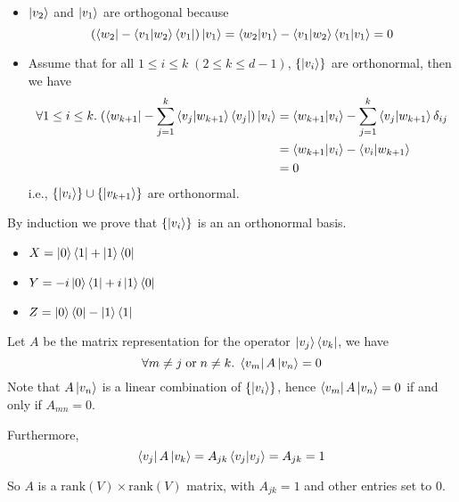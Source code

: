 \documentclass{homeworg}
\begin{document}
\begin{itemize}
    \item $\ket{v_2}$ and $\ket{v_1}$ are orthogonal because
    \[(\bra{w_2}-\braket{v_1|w_2}\bra{v_1})\ket{v_1}=\braket{w_2|v_1}-\braket{v_1|w_2}\braket{v_1|v_1}=0
    \]
    \item Assume that for all $1\leq i\leq k\;(2\leq k\leq d-1)$, $\{\ket{v_i}\}$ are orthonormal, then we have
    \begin{align}
        \forall 1\leq i\leq k.\;(\bra{w_{k+1}}-\sum_{j=1}^{k}\braket{v_j|w_{k+1}}\bra{v_j})\ket{v_i}&=\braket{w_{k+1}|v_i}-\sum_{j=1}^{k}\braket{v_j|w_{k+1}}\delta_{ij}\nonumber\\
        &=\braket{w_{k+1}|v_i}-\braket{v_i|w_{k+1}}\nonumber\\
        &=0\nonumber
    \end{align}
    i.e., $\{\ket{v_i}\}\cup\{\ket{v_{k+1}}\}$ are orthonormal.
    
\end{itemize}

By induction we prove that $\{\ket{v_i}\}$ is an an orthonormal basis.

\exercise*
\begin{itemize}
    \item $X=\ket{0}\bra{1}+\ket{1}\bra{0}$
    \item $Y=-i\ket{0}\bra{1}+i\ket{1}\bra{0}$
    \item $Z=\ket{0}\bra{0}-\ket{1}\bra{1}$
\end{itemize}

\exercise*
Let $A$ be the matrix representation for the operator $\ket{v_j}\bra{v_k}$, we have
\[\forall m\neq j\;\text{or}\;n\neq k.\;\bra{v_m}A\ket{v_n}=0\]
Note that $A\ket{v_n}$ is a linear combination of $\{\ket{v_i}\}$, hence $\bra{v_m}A\ket{v_n}=0$ if and only if $A_{mn}=0$.

Furthermore,
\[\bra{v_j}A\ket{v_k}=A_{jk}\braket{v_j|v_j}=A_{jk}=1\]

So $A$ is a $\text{rank}(V)\times \text{rank}(V)$ matrix, with $A_{jk}=1$ and other entries set to 0.
\end{document}
